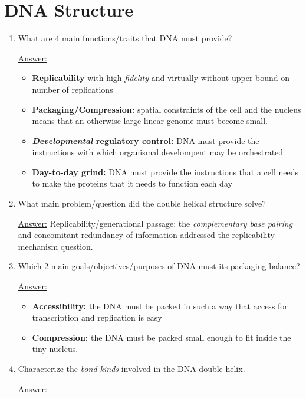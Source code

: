 \documentclass{article}
\newenvironment{QandA}{\begin{enumerate}[label=\bfseries Q\arabic*.]}
                       {\end{enumerate}}
\newenvironment{answered}{\par\normalfont\underline{Answer:}}{}
\begin{document}
\section{DNA Structure}
\begin{QandA}
  \item{What are 4 main functions/traits that DNA must provide?}
    \begin{answered}
    \begin{itemize}
      \item{\textbf{Replicability} with high \textit{fidelity} and virtually without upper bound on number of replications}
      \item{\textbf{Packaging/Compression:} spatial constraints of the cell and the nucleus means that an otherwise large linear genome must become small.}
      \item{\textbf{\textit{Developmental} regulatory control:} DNA must provide the instructions with which organismal develompent may be orchestrated}
      \item{\textbf{Day-to-day grind:} DNA must provide the instructions that a cell needs to make the proteins that it needs to function each day}
    \end{itemize}
    \end{answered}
  \item{What main problem/question did the double helical structure solve?}
    \begin{answered}
    Replicability/generational passage: the \textit{complementary base pairing} and concomitant redundancy of information addressed the replicability mechanism question.
    \end{answered}
  \item{Which 2 main goals/objectives/purposes of DNA must its packaging balance?}
    \begin{answered}
    \begin{itemize}
      \item{\textbf{Accessibility:} the DNA must be packed in such a way that access for transcription and replication is easy}
      \item{\textbf{Compression:} the DNA must be packed small enough to fit inside the tiny nucleus.}
    \end{itemize}
    \end{answered}
  \item{Characterize the \textit{bond kinds} involved in the DNA double helix.}
    \begin{answered}
    \begin{itemize}

\end{itemize}
\end{answered}
\end{QandA}
\end{document}

